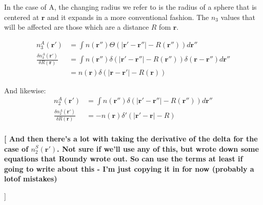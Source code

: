 \documentclass[letterpaper,twocolumn,amsmath,amssymb,jcp,10pt,aip]{revtex4-1}
\newcommand{\red}[1]{{\bf \color{red} #1}}
\newcommand{\fixme}[1]{\red{[#1]}}
\begin{document}
{  In the case of A, the changing radius we refer to is the radius of a sphere that is centered at $\mathbf{r}$ and it expands in a more conventional fashion.  The $n_3$ values that will be affected are those which are a distance $R$ fom $\mathbf{r}$.

\begin{align}
  n_3^{A}(\mathbf{r}') &= \int n(\mathbf{r}'') \Theta(\left|\mathbf{r}' - \mathbf{r}''\right| -R(\mathbf{r}'')) d\mathbf{r}''\\ 
  \frac{\delta n_3^{A} (\mathbf{r}')}{\delta R(\mathbf{r})} &=
  \int n (\mathbf{r}'') \delta(|\mathbf{r}' - \mathbf{r}''| - R(\mathbf{r}'')) \delta(\mathbf{r}-\mathbf{r}'') d\mathbf{r}'' \\
   &= n (\mathbf{r}) \delta(|\mathbf{r} - \mathbf{r}'| - R(\mathbf{r}))
\end{align}
 
And likewise:
\begin{align}
  n_2^{A}(\mathbf{r}') &= \int n(\mathbf{r}'') \delta(|\mathbf{r}' - \mathbf{r}''| - R(\mathbf{r}'')) d \mathbf{r}''\\
  \frac{\delta n_2^{A}(\mathbf{r}')}{\delta R(\mathbf{r})} &= -n(\mathbf{r}) \delta'(|\mathbf{r}' - \mathbf{r}| - R)\\
 \end{align}

 \fixme {
And then there's a lot with taking the derivative of the delta for the case of $n_{2}^{S}(\mathbf{r}')$.  Not sure if we'll use any of this, but wrote down some equations that Roundy wrote out.  So can use the terms at least if going to write about this - I'm just copying it in for now (probably a lotof mistakes)

}}
\end{document}
